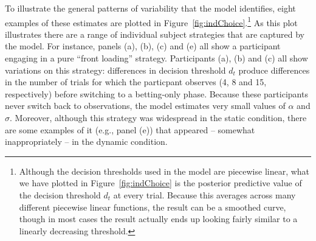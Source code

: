 \documentclass[authoryear]{elsarticle}
\begin{document}
To illustrate the general patterns of variability that the model identifies, eight examples of these estimates are plotted in Figure~\ref{fig:indChoice}.\footnote{Although the decision thresholds used in the model are piecewise linear, what we have plotted in Figure~\protect\ref{fig:indChoice} is the posterior predictive value of the decision threshold $d_t$ at every trial. Because this averages across many different piecewise linear functions, the result can be a smoothed curve, though in most cases the result actually ends up looking fairly similar to a linearly decreasing threshold.} As this plot illustrates there are a range of individual subject strategies that are captured by the model. For instance, panels (a), (b), (c) and (e) all show a participant engaging in a pure ``front loading'' strategy. Participants (a), (b) and (c) all show variations on this strategy: differences in decision threshold $d_t$ produce differences in the number of trials for which the particpant observes (4, 8 and 15, respectively) before switching to a betting-only phase. Because these participants never switch back to observations, the model estimates very small values of $\alpha$ and $\sigma$. Moreover, although this strategy was widespread in the static condition, there are some examples of it (e.g., panel (e)) that appeared -- somewhat inappropriately -- in the dynamic condition.
\end{document}
